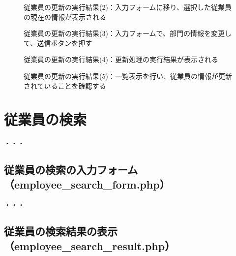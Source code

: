 \documentclass[a4j,12pt]{jreport}
\begin{document}
\begin{figure}[h]
	\begin{center}
	\end{center}
	\caption{従業員の更新の実行結果(2)：入力フォームに移り、選択した従業員の現在の情報が表示される
	}
	\label{fig:employee_update2}
\end{figure}

\begin{figure}[h]
	\begin{center}
	\end{center}
	\caption{従業員の更新の実行結果(3)：入力フォームで、部門の情報を変更して、送信ボタンを押す
	}
	\label{fig:employee_update3}
\end{figure}

\begin{figure}[h]
	\begin{center}
	\end{center}
	\caption{従業員の更新の実行結果(4)：更新処理の実行結果が表示される
	}
	\label{fig:employee_update4}
\end{figure}

\begin{figure}[h]
	\begin{center}
	\end{center}
	\caption{従業員の更新の実行結果(5)：一覧表示を行い、従業員の情報が更新されていることを確認する
	}
	\label{fig:employee_update5}
\end{figure}


\clearpage

\section{従業員の検索}

・・・

\subsection{従業員の検索の入力フォーム（employee\_search\_form.php）}

・・・

\subsection{従業員の検索結果の表示（employee\_search\_result.php）}
\end{document}
